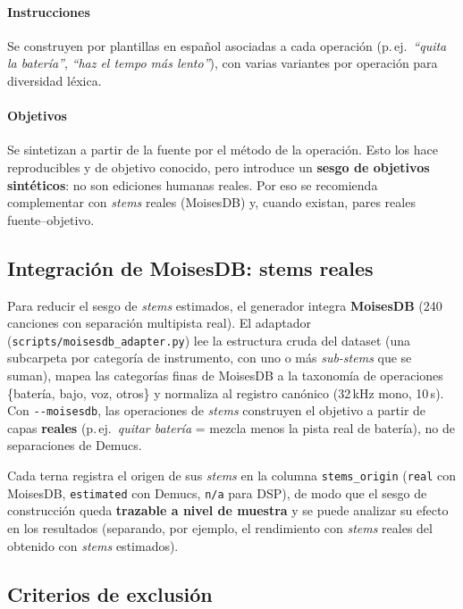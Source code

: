 \paragraph{Instrucciones} Se construyen por plantillas en español asociadas a
cada operación (p.\,ej.\ \textit{``quita la batería''}, \textit{``haz el tempo
más lento''}), con varias variantes por operación para diversidad léxica.

\paragraph{Objetivos} Se sintetizan a partir de la fuente por el método de la
operación. Esto los hace reproducibles y de objetivo conocido, pero introduce un
\textbf{sesgo de objetivos sintéticos}: no son ediciones humanas reales. Por eso
se recomienda complementar con \textit{stems} reales (MoisesDB) y, cuando existan,
pares reales fuente--objetivo.

\subsection{Integración de MoisesDB: stems reales}
\label{sec:edit:data:moisesdb}

Para reducir el sesgo de \textit{stems} estimados, el generador integra
\textbf{MoisesDB} (240 canciones con separación multipista real). El adaptador
(\texttt{scripts/moisesdb\_adapter.py}) lee la estructura cruda del dataset
(una subcarpeta por categoría de instrumento, con uno o más \textit{sub-stems}
que se suman), mapea las categorías finas de MoisesDB a la taxonomía de
operaciones \{batería, bajo, voz, otros\} y normaliza al registro canónico
(32\,kHz mono, 10\,s). Con \texttt{-{}-moisesdb}, las operaciones de \textit{stems}
construyen el objetivo a partir de capas \textbf{reales} (p.\,ej.\
\textit{quitar batería} = mezcla menos la pista real de batería), no de
separaciones de Demucs.

Cada terna registra el origen de sus \textit{stems} en la columna
\texttt{stems\_origin} (\texttt{real} con MoisesDB, \texttt{estimated} con
Demucs, \texttt{n/a} para DSP), de modo que el sesgo de construcción queda
\textbf{trazable a nivel de muestra} y se puede analizar su efecto en los
resultados (separando, por ejemplo, el rendimiento con \textit{stems} reales del
obtenido con \textit{stems} estimados).

\subsection{Criterios de exclusión}
\label{sec:edit:data:exclusion}

